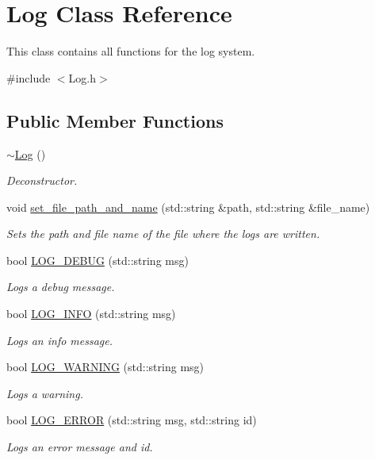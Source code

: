 \hypertarget{class_log}{\section{Log Class Reference}
\label{class_log}
}


This class contains all functions for the log system.  




{\ttfamily \#include $<$Log.\-h$>$}

\subsection*{Public Member Functions}
\begin{DoxyCompactItemize}
\item 
\hypertarget{class_log_a0fbfda88fbee5027c89f6eb121059360}{\hyperlink{class_log_a0fbfda88fbee5027c89f6eb121059360}{$\sim$\-Log} ()}\label{class_log_a0fbfda88fbee5027c89f6eb121059360}

\begin{DoxyCompactList}\small\item\em Deconstructor. \end{DoxyCompactList}\item 
void \hyperlink{class_log_a21e4fa27b81705aa6c3e368f15fc0480}{set\-\_\-file\-\_\-path\-\_\-and\-\_\-name} (std\-::string \&path, std\-::string \&file\-\_\-name)
\begin{DoxyCompactList}\small\item\em Sets the path and file name of the file where the logs are written. \end{DoxyCompactList}\item 
bool \hyperlink{class_log_a3af4278e101ea9da1a29251d62ea00c7}{L\-O\-G\-\_\-\-D\-E\-B\-U\-G} (std\-::string msg)
\begin{DoxyCompactList}\small\item\em Logs a debug message. \end{DoxyCompactList}\item 
bool \hyperlink{class_log_ad08d13b8977b9857aae926f7afd57b12}{L\-O\-G\-\_\-\-I\-N\-F\-O} (std\-::string msg)
\begin{DoxyCompactList}\small\item\em Logs an info message. \end{DoxyCompactList}\item 
bool \hyperlink{class_log_a512daa3070c737780510f0716ebcf635}{L\-O\-G\-\_\-\-W\-A\-R\-N\-I\-N\-G} (std\-::string msg)
\begin{DoxyCompactList}\small\item\em Logs a warning. \end{DoxyCompactList}\item 
bool \hyperlink{class_log_a65bbf0bafe544c57060fdcb934ac20b2}{L\-O\-G\-\_\-\-E\-R\-R\-O\-R} (std\-::string msg, std\-::string id)
\begin{DoxyCompactList}\small\item\em Logs an error message and id. \end{DoxyCompactList}\end{DoxyCompactItemize}
